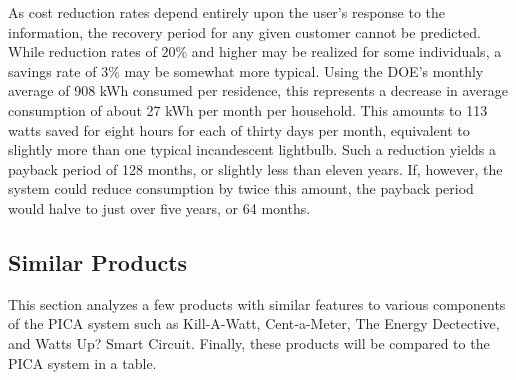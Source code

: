  As cost reduction rates depend entirely upon the user's response to the information, the recovery period for any given customer cannot be predicted. While reduction rates of $20\%$ and higher may be realized for some individuals, a savings rate of 3\% may be somewhat more typical. Using the \ac{DOE}'s monthly average of 908 kWh consumed per residence, this represents a decrease in average consumption of about 27 kWh per month per household. This amounts to 113 watts saved for eight hours for each of thirty days per month, equivalent to slightly more than one typical incandescent lightbulb. Such a reduction yields a payback period of 128 months, or slightly less than eleven years. If, however, the system could reduce consumption by twice this amount, the payback period would halve to just over five years, or 64 months.

\subsection{Similar Products} %
This section analyzes a few products with similar features to various components of the PICA system such as Kill-A-Watt, Cent-a-Meter, The Energy Dectective, and Watts Up? Smart Circuit. Finally, these products will be compared to the PICA system in a table.

